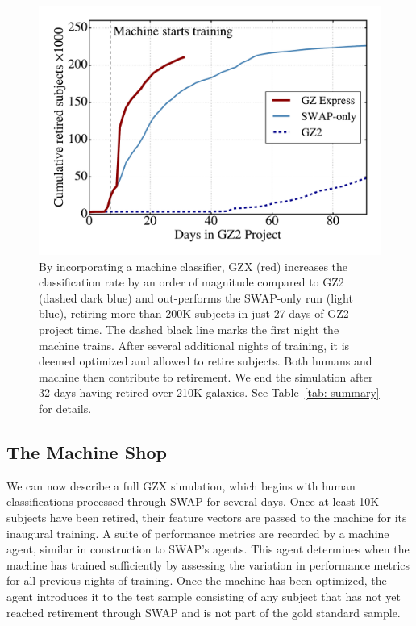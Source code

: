 \documentclass[twocolumn]{aastex6}
\begin{document}
\begin{figure}[t!]
\centering
\includegraphics[width=6in]{figures/GZX_moneyplot.pdf}
\caption{By incorporating a machine classifier, GZX (red) increases the classification rate by an order of magnitude compared to GZ2 (dashed dark blue) and out-performs the SWAP-only run (light blue), retiring more than 200K subjects in just 27 days of GZ2 project time. The dashed black line marks the first night the machine trains. After several additional nights of training, it is deemed optimized and allowed to retire subjects. Both humans and machine then contribute to retirement. We end the simulation after 32 days having retired over 210K galaxies. See Table~\ref{tab: summary} for details. \label{fig: money}}
\end{figure}


\subsection{The Machine Shop}\label{sec: machine shop}
We can now describe a full GZX simulation, which begins with human classifications 
processed through SWAP for several days.   
Once at least 10K subjects have been retired, their feature vectors are passed to 
the machine for its inaugural training. 
A suite of performance metrics are recorded by a machine agent, similar
in construction to SWAP's agents. This agent determines 
when the machine has trained sufficiently by assessing the variation
in performance metrics for all previous nights of training. 
Once the machine has been optimized, the agent introduces it to the test sample
consisting of any subject that has not yet reached retirement through SWAP 
and is not part of the gold standard sample.  
\end{document}
